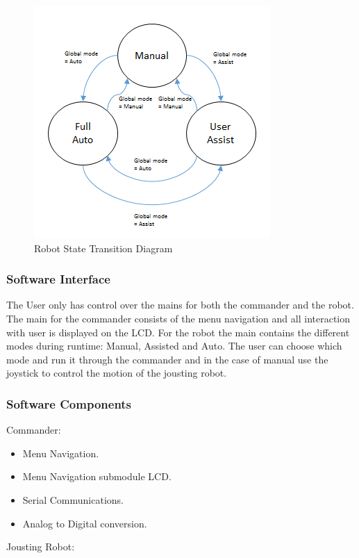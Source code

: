 \documentclass[MTRX3700report.tex]{subfiles}
\begin{document}
	\begin{figure}[h]
		\includegraphics[scale=0.7]{robot_std.png}
		\centering
		\caption{Robot State Transition Diagram}
	\end{figure}

\subsubsection{Software Interface}
The User only has control over the mains for both the commander and the robot.
The main for the commander consists of the menu navigation and all interaction with user is displayed on the LCD. For the robot the main contains the different modes during runtime: Manual, Assisted and Auto. The user can choose which mode and run it through the commander and in the case of manual use the joystick to control the motion of the jousting robot.


\subsubsection{Software Components}

Commander:
\begin{itemize}
	\item Menu Navigation.
	\item Menu Navigation submodule LCD.
	\item Serial Communications. 
	\item Analog to Digital conversion.
\end{itemize}
	
Jousting Robot:
\end{document}
